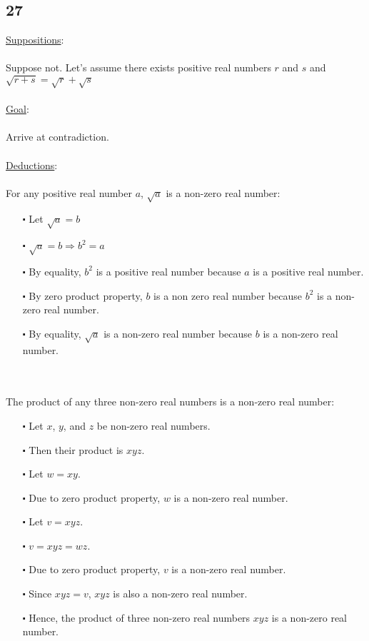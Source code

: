 \documentclass[12pt]{article}
\begin{document}
\subsection*{27}
\underline{Suppositions}:
\\ \\
Suppose not. Let's assume there exists positive real numbers $r$ and $s$ and $\sqrt{r+s} = \sqrt{r} + \sqrt{s}$
\\ \\
\underline{Goal}:
\\ \\
Arrive at contradiction.
\\ \\
\underline{Deductions}:
\\ \\
For any positive real number $a$, $\sqrt{a}$ is a non-zero real number:
\begin{itemize}
  \item [$\centerdot$] Let $\sqrt{a} = b$
  \item [$\centerdot$] $\sqrt{a} = b \Rightarrow b^2 = a$
  \item [$\centerdot$] By equality, $b^2$ is a positive real number because $a$ is a positive real number.
  \item [$\centerdot$] By zero product property, $b$ is a non zero real number because $b^2$ is a non-zero real number.
  \item [$\centerdot$] By equality, $\sqrt{a}$ is a non-zero real number because $b$ is a non-zero real number.
\end{itemize}
\newblock
\\ \\
The product of any three non-zero real numbers is a non-zero real number:
\begin{itemize}
  \item [$\centerdot$] Let $x$, $y$, and $z$ be non-zero real numbers.
  \item [$\centerdot$] Then their product is $xyz$.
  \item [$\centerdot$] Let $w = xy$.
  \item [$\centerdot$] Due to zero product property, $w$ is a non-zero real number.
  \item [$\centerdot$] Let $v = xyz$.
  \item [$\centerdot$] $v = xyz = wz$.
  \item [$\centerdot$] Due to zero product property, $v$ is a non-zero real number.
  \item [$\centerdot$] Since $xyz = v$, $xyz$ is also a non-zero real number.
  \item [$\centerdot$] Hence, the product of three non-zero real numbers $xyz$ is a non-zero real number.
\end{itemize}
\end{document}
